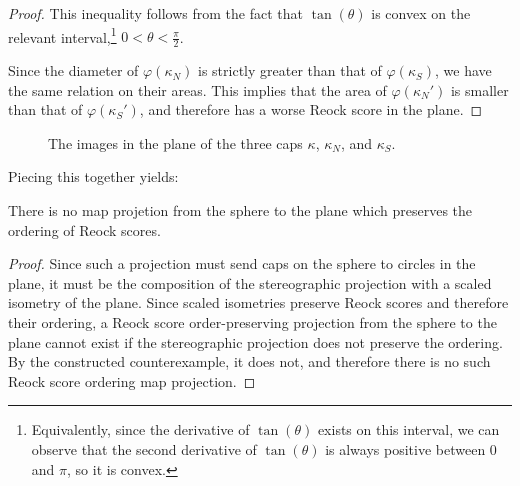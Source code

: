 \begin{proof}
This inequality follows from the fact that $\tan(\theta)$ is convex on the relevant interval,\footnote{Equivalently, since the derivative of $\tan(\theta)$ exists on this interval, we can observe that the second derivative of $\tan(\theta)$ is always positive between $0$ and $\pi$, so it is convex.} $0<\theta<\tfrac{\pi}{2}$.

Since  the diameter of $\varphi(\kappa_N)$ is strictly {greater} than that of $\varphi(\kappa_S)$, we have the same relation on their areas.  This implies that the area of $\varphi(\kappa_N')$ is smaller than that of $\varphi(\kappa_S')$, and therefore has a worse Reock score in the plane. 
   
  
\end{proof}


\begin{figure}[h]
	\centering
	
	\caption{The images in the plane of the three caps $\kappa$, $\kappa_N$, and $\kappa_S$.}
	\label{fig:reock_schema}
\end{figure}

Piecing this together yields:
\begin{theorem}
  There is no map projetion from the sphere to the plane which preserves the ordering of Reock scores.
\end{theorem}

\begin{proof}
	  Since such a projection must send caps on the sphere to circles in the
	plane, it must be the composition of the stereographic projection with
	a scaled isometry of the plane.  Since scaled isometries preserve
	Reock scores and therefore their ordering, a Reock score
	order-preserving projection from the sphere to the plane cannot exist
	if the stereographic projection does not preserve the ordering.  By
	the constructed counterexample, it does not, and therefore there is no
	such Reock score ordering map projection.
\end{proof}
